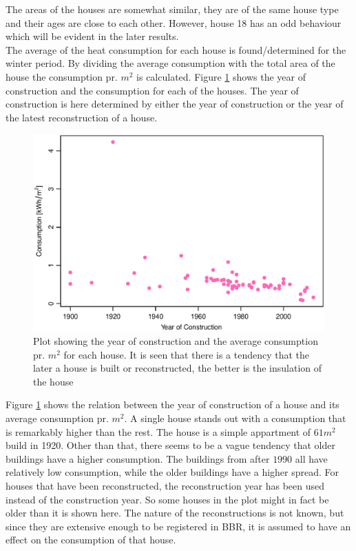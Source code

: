 \noindent The areas of the houses are somewhat similar, they are of the same house type and their ages are close to each other. However, house 18 has an odd behaviour which will be evident in the later results. \\

\noindent The average of the heat consumption for each house is found/determined for the winter period. By dividing the average consumption with the total area of the house the consumption pr. $m^2$ is calculated. Figure \ref{fig: byggeaar} shows the year of construction and the consumption for each of the houses. The year of construction is here determined by either the year of construction or the year of the latest reconstruction of a house. 
\begin{figure}
    \centering
    \includegraphics[width=.8\textwidth]{../../../figures/byggeaar.eps}
    \caption{Plot showing the year of construction and the average consumption pr. $m^2$ for each house. It is seen that there is a tendency that the later a house is built or reconstructed, the better is the insulation of the house}
    \label{fig: byggeaar}
\end{figure}

\noindent Figure \ref{fig: byggeaar} shows the relation between the year of construction of a house and its average consumption pr. $m^2$. A single house stands out with a consumption that is remarkably higher than the rest. The house is a simple appartment of $61 m^2$ build in 1920. Other than that, there seems to be a vague tendency that older buildings have a higher consumption. The buildings from after $1990$ all have relatively low consumption, while the older buildings have a higher spread. For houses that have been reconstructed, the reconstruction year has been used instead of the construction year. So some houses in the plot might in fact be older than it is shown here. The nature of the reconstructions is not known, but since they are extensive enough to be registered in BBR, it is assumed to have an effect on the consumption of that house.


